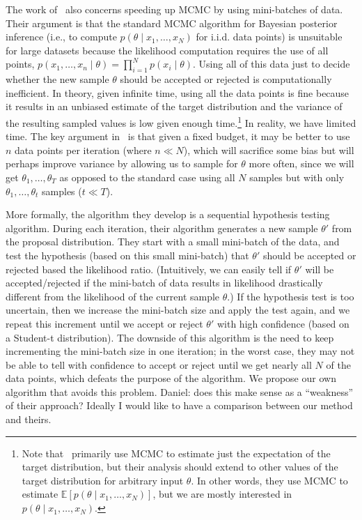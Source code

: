 \documentclass{article}
\begin{document}
The work of~\cite{cutting_mh_2014} also concerns speeding up MCMC 
by using mini-batches of data. Their argument is that the standard MCMC algorithm for Bayesian
posterior inference (i.e., to compute $p(\theta \mid x_1, \ldots, x_N)$ for i.i.d. data points) is
unsuitable for large datasets because the likelihood computation requires the use of all points,
$p(x_1, \ldots, x_n \mid \theta) = \prod_{i=1}^Np(x_i\mid \theta)$. Using all of this data just to
decide whether the new sample $\theta$ should be accepted or rejected is computationally
inefficient. In theory, given infinite time, using all the data points is fine because it results in
an unbiased estimate of the target distribution and the variance of the resulting sampled values is
low given enough time.\footnote{Note that~\cite{cutting_mh_2014} primarily use MCMC to estimate just
the expectation of the target distribution, but their analysis should extend to other values of the
target distribution for arbitrary input $\theta$. In other words, they use MCMC to estimate
$\mathbb{E}[p(\theta \mid x_1, \ldots, x_N)]$, but we are mostly interested in $p(\theta \mid x_1,
\ldots, x_N)$.} In reality, we have limited time. The key argument in~\cite{cutting_mh_2014} is that
given a fixed budget, it may be better to use $n$ data points per iteration (where $n \ll N$), which
will sacrifice some bias but will perhaps improve variance by allowing us to sample for $\theta$
more often, since we will get $\theta_1, \ldots, \theta_T$ as opposed to the standard case using all
$N$ samples but with only $\theta_1, \ldots, \theta_t$ samples ($t \ll T$).

More formally, the algorithm they develop is a sequential hypothesis testing algorithm. During each
iteration, their algorithm generates a new sample $\theta'$ from the proposal distribution. They
start with a small mini-batch of the data, and test the hypothesis (based on this small mini-batch)
that $\theta'$ should be accepted or rejected based the likelihood ratio. (Intuitively, we can
easily tell if $\theta'$ will be accepted/rejected if the mini-batch of data results in likelihood
drastically different from the likelihood of the current sample $\theta$.) If the hypothesis test is
too uncertain, then we increase the mini-batch size and apply the test again, and we repeat this
increment until we accept or reject $\theta'$ with high confidence (based on a Student-t
distribution). The downside of this algorithm is the need to keep incrementing the mini-batch size in one iteration; in the worst case, they may not be able to tell with confidence to accept or
reject until we get nearly all $N$ of the data points, which defeats the purpose of the algorithm.
We propose our own algorithm that avoids this problem. {\color{blue} Daniel: does this make sense as
a ``weakness'' of their approach?  Ideally I would like to have a comparison between our method and
theirs.}
\end{document}
